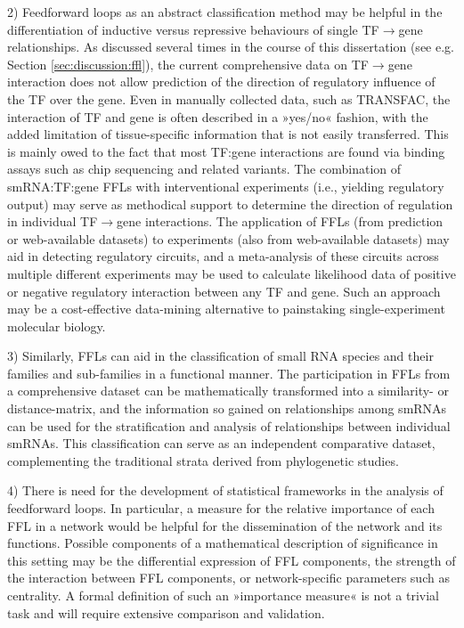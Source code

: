 2) Feedforward loops as an abstract classification method may be helpful in the differentiation of inductive versus repressive behaviours of single TF$\to$gene relationships. As discussed several times in the course of this dissertation (see e.g. Section \ref{sec:discussion:ffl}), the current comprehensive data on TF$\to$gene interaction does not allow prediction of the direction of regulatory influence of the TF over the gene. Even in manually collected data, such as TRANSFAC, the interaction of TF and gene is often described in a »yes/no« fashion, with the added limitation of tissue-specific information that is not easily transferred. This is mainly owed to the fact that most TF:gene interactions are found via binding assays such as \ac{chip} sequencing and related variants. The combination of smRNA:TF:gene FFLs with interventional experiments (i.e., yielding regulatory output) may serve as methodical support to determine the direction of regulation in individual TF$\to$gene interactions. The application of FFLs (from prediction or web-available datasets) to experiments (also from web-available datasets) may aid in detecting regulatory circuits, and a meta-analysis of these circuits across multiple different experiments may be used to calculate likelihood data of positive or negative regulatory interaction between any TF and gene. Such an approach may be a cost-effective data-mining alternative to painstaking single-experiment molecular biology.

3) Similarly, FFLs can aid in the classification of small RNA species and their families and sub-families in a functional manner. The participation in FFLs from a comprehensive dataset can be mathematically transformed into a similarity- or distance-matrix, and the information so gained on relationships among smRNAs can be used for the stratification and analysis of relationships between individual smRNAs. This classification can serve as an independent comparative dataset, complementing the traditional strata derived from phylogenetic studies.

4) There is need for the development of statistical frameworks in the analysis of feedforward loops. In particular, a measure for the relative importance of each FFL in a network would be helpful for the dissemination of the network and its functions. Possible components of a mathematical description of significance in this setting may be the differential expression of FFL components, the strength of the interaction between FFL components, or network-specific parameters such as centrality. A formal definition of such an »importance measure« is not a trivial task and will require extensive comparison and validation.

\newpage